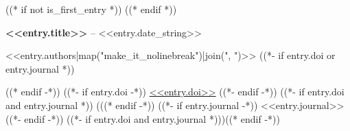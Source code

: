((* if not is_first_entry *))
\vspace{8pt}
((* endif *))

\textbf{<<entry.title>>} -- <<entry.date_string>>
\begin{highlights}
    \item <<entry.authors|map("make_it_nolinebreak")|join(", ")>>
    ((*- if entry.doi or entry.journal *)) \item ((* endif -*))
    ((*- if entry.doi -*))
    \href{<<entry.doi_url>>}{<<entry.doi>>}
    ((*- endif -*))
    ((*- if entry.doi and entry.journal *)) (((* endif -*))
    ((*- if entry.journal -*))
    <<entry.journal>>
    ((*- endif -*))
    ((*- if entry.doi and entry.journal *)))((* endif -*))
\end{highlights}
